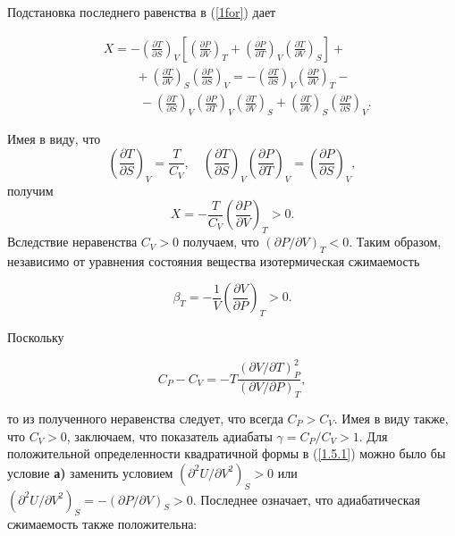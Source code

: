 \documentclass[a4paper,14pt]{article} %
\begin{document}
Подстановка последнего равенства в (\ref{1for}) дает

\begin{equation*}
	\begin{aligned}
		&X=-\left(\frac{\partial T}{\partial S}\right)_{V}\left[\left(\frac{\partial P}{\partial V}\right)_{T}+\left(\frac{\partial P}{\partial T}\right)_{V}\left(\frac{\partial T}{\partial V}\right)_{S}\right]+ \\
		&\ \ \ \ \ \ \ \quad+\left(\frac{\partial T}{\partial V}\right)_{S}\left(\frac{\partial P}{\partial S}\right)_{V}=-\left(\frac{\partial T}{\partial S}\right)_{V}\left(\frac{\partial P}{\partial V}\right)_{T}- \\
		&\ \ \ \ \ \ \ \ \ \ \ \ \ -\left(\frac{\partial T}{\partial S}\right)_{V}\left(\frac{\partial P}{\partial T}\right)_{V}\left(\frac{\partial T}{\partial V}\right)_{S}+\left(\frac{\partial T}{\partial V}\right)_{S}\left(\frac{\partial P}{\partial S}\right)_{V} .
	\end{aligned}
\end{equation*}

Имея в виду, что
$$
\left(\frac{\partial T}{\partial S}\right)_{V}=\frac{T}{C_{V}}, \quad\left(\frac{\partial T}{\partial S}\right)_{V}\left(\frac{\partial P}{\partial T}\right)_{V}=\left(\frac{\partial P}{\partial S}\right)_{V},
$$
получим
$$
X=-\frac{T}{C_{V}}\left(\frac{\partial P}{\partial V}\right)_{T}>0 .
$$
Вследствие неравенства $C_{V}>0$ получаем, что $(\partial P / \partial V)_{T}<0 .$ Таким образом, независимо от уравнения состояния вещества изотермическая сжимаемость

\begin{equation*}
	\beta_{T}=-\frac{1}{V}\left(\frac{\partial V}{\partial P}\right)_{T}>0.
\end{equation*}

Поскольку 

\begin{equation*}
	C_{P}-C_{V}=-T \frac{(\partial V / \partial T)_{P}^{2}}{(\partial V / \partial P)_{T}},
\end{equation*}

то из полученного неравенства следует, что всегда $C_{P}>C_{V} .$ Имея в виду также, что $C_{V}>0$, заключаем, что показатель адиабаты $\gamma=C_{P} / C_{V}>1 .$ Для положительной определенности квадратичной формы в (\ref{1.5.1}) можно было бы условие \textbf{а)} заменить условием $\left(\partial^{2} U / \partial V^{2}\right)_{S}>0$ или $\left(\partial^{2} U / \partial V^{2}\right)_{S}=-(\partial P / \partial V)_{S}>0 .$ Последнее означает, что адиабатическая сжимаемость также положительна:
\end{document}
